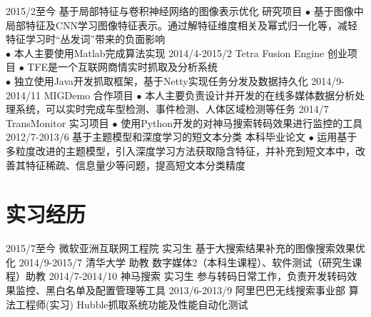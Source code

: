 \documentclass[a4paper,10pt]{professional-cv-cn}
\begin{document}
\begin{entrylist}
  \entry
    {2015/2至今}
    {基于局部特征与卷积神经网络的图像表示优化}
    {研究项目}
    {$\bullet$ 基于图像中局部特征及CNN学习图像特征表示。通过解特征维度相关及幂式归一化等，减轻特征学习时“丛发词”带来的负面影响 \\
    $\bullet$ 本人主要使用Matlab完成算法实现}
  \entry
    {2014/4-2015/2}
    {Tetra Fusion Engine}
    {创业项目}
    {$\bullet$ TFE是一个互联网商情实时抓取及分析系统\\
    $\bullet$ 独立使用Java开发抓取框架，基于Netty实现任务分发及数据持久化}
  \entry
    {2014/9-2014/11}
    {MIGDemo}
    {合作项目}
    {$\bullet$ 本人主要负责设计并开发的在线多媒体数据分析处理系统，可以实时完成车型检测、事件检测、人体区域检测等任务}
  \entry
    {2014/7}
    {TransMonitor}
    {实习项目}
    {$\bullet$ 使用Python开发的对神马搜索转码效果进行监控的工具}
  \entry
    {2012/7-2013/6}
    {基于主题模型和深度学习的短文本分类}
    {本科毕业论文}
    {$\bullet$ 运用基于多粒度改进的主题模型，引入深度学习方法获取隐含特征，并补充到短文本中，改善其特征稀疏、信息量少等问题，提高短文本分类精度}
\end{entrylist}

\section{实习经历}
\begin{entrylist}
  \internentry
    {2015/7至今}
    {微软亚洲互联网工程院}
    {实习生}
    {基于大搜索结果补充的图像搜索效果优化}
  \internentry
    {2014/9-2015/7}
    {清华大学}
    {助教}
    {数字媒体2（本科生课程）、软件测试（研究生课程）助教}
  \internentry
    {2014/7-2014/10}
    {神马搜索}
    {实习生}
    {参与转码日常工作，负责开发转码效果监控、黑白名单及配置管理等工具}
  \internentry
    {2013/6-2013/9}
    {阿里巴巴无线搜索事业部}
    {算法工程师(实习)}
    {Hubble抓取系统功能及性能自动化测试}
\end{entrylist}
\end{document}
